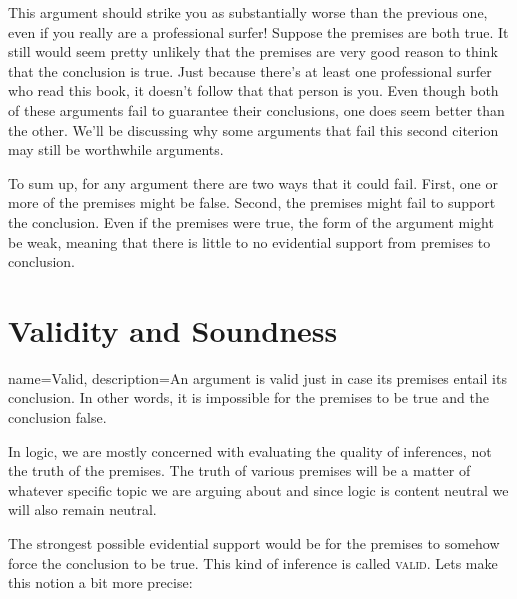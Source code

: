 \begin{kormanize}
\end{kormanize}

This argument should strike you as substantially worse than the previous one, even if you really are a professional surfer! Suppose the premises are both true. It still would seem pretty unlikely that the premises are very good reason to think that the conclusion is true. Just because there's at least one professional surfer who read this book, it doesn't follow that that person is you. Even though both of these arguments fail to guarantee their conclusions, one does seem better than the other. We'll be discussing why some arguments that fail this second citerion may still be worthwhile arguments.

To sum up, for any argument there are two ways that it could fail. First, one or more of the premises might be false.  Second, the premises might fail to support the conclusion. Even if the premises were true, the form of the argument might be weak, meaning that there is little to no evidential support from premises to conclusion.



\section{Validity and Soundness}

{
name=Valid,
description={An argument is valid just in case its premises entail its conclusion. In other words, it is impossible for the premises to be true and the conclusion false.}
}

In logic, we are mostly concerned with evaluating the quality of inferences, not the truth of the premises. The truth of various premises will be a matter of whatever specific topic we are arguing about and since logic is content neutral we will also remain neutral.

The strongest possible evidential support would be for the premises to somehow force the conclusion to be true. This kind of inference is called \textsc{\gls{valid}}. Lets make this notion a bit more precise:

